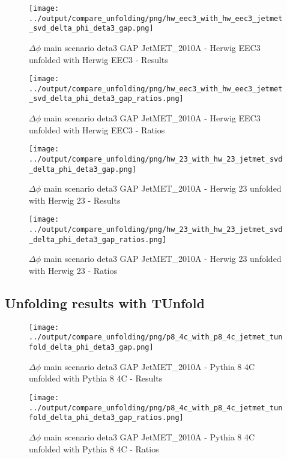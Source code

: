 \documentclass[11pt]{book}
\begin{document}
\begin{figure}[ht]
\centering
\texttt{[image: ../output/compare\_unfolding/png/hw\_eec3\_with\_hw\_eec3\_jetmet\_svd\_delta\_phi\_deta3\_gap.png]}
\caption{$\Delta\phi$ main scenario deta3 GAP JetMET\_2010A - Herwig EEC3 unfolded with Herwig EEC3 - Results}
\label{hw_eec3_hw_eec3_jetmet_svd_delta_phi_deta3_gap_a}
\end{figure}

\begin{figure}[ht]
\centering
\texttt{[image: ../output/compare\_unfolding/png/hw\_eec3\_with\_hw\_eec3\_jetmet\_svd\_delta\_phi\_deta3\_gap\_ratios.png]}
\caption{$\Delta\phi$ main scenario deta3 GAP JetMET\_2010A - Herwig EEC3 unfolded with Herwig EEC3 - Ratios}
\label{hw_eec3_hw_eec3_jetmet_svd_delta_phi_deta3_gap_b}
\end{figure}

\begin{figure}[ht]
\centering
\texttt{[image: ../output/compare\_unfolding/png/hw\_23\_with\_hw\_23\_jetmet\_svd\_delta\_phi\_deta3\_gap.png]}
\caption{$\Delta\phi$ main scenario deta3 GAP JetMET\_2010A - Herwig 23 unfolded with Herwig 23 - Results}
\label{hw_23_hw_23_jetmet_svd_delta_phi_deta3_gap_a}
\end{figure}

\begin{figure}[ht]
\centering
\texttt{[image: ../output/compare\_unfolding/png/hw\_23\_with\_hw\_23\_jetmet\_svd\_delta\_phi\_deta3\_gap\_ratios.png]}
\caption{$\Delta\phi$ main scenario deta3 GAP JetMET\_2010A - Herwig 23 unfolded with Herwig 23 - Ratios}
\label{hw_23_hw_23_jetmet_svd_delta_phi_deta3_gap_b}
\end{figure}


\clearpage
\subsection{Unfolding results with TUnfold}

\begin{figure}[ht]
\centering
\texttt{[image: ../output/compare\_unfolding/png/p8\_4c\_with\_p8\_4c\_jetmet\_tunfold\_delta\_phi\_deta3\_gap.png]}
\caption{$\Delta\phi$ main scenario deta3 GAP JetMET\_2010A - Pythia 8 4C unfolded with Pythia 8 4C - Results}
\label{p8_p8_jetmet_tunfold_delta_phi_deta3_gap_a}
\end{figure}

\begin{figure}[ht]
\centering
\texttt{[image: ../output/compare\_unfolding/png/p8\_4c\_with\_p8\_4c\_jetmet\_tunfold\_delta\_phi\_deta3\_gap\_ratios.png]}
\caption{$\Delta\phi$ main scenario deta3 GAP JetMET\_2010A - Pythia 8 4C unfolded with Pythia 8 4C - Ratios}
\label{p8_p8_jetmet_tunfold_delta_phi_deta3_gap_b}
\end{figure}
\end{document}
